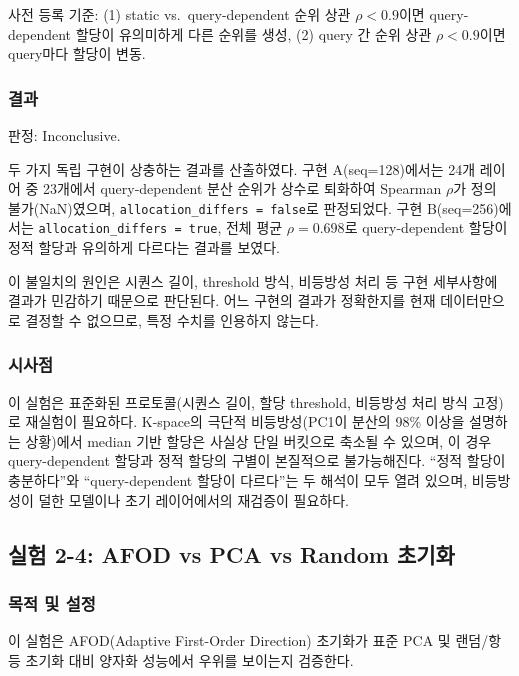 \documentclass[11pt,a4paper]{article}
\begin{document}
사전 등록 기준: (1) static vs.\ query-dependent 순위 상관 $\rho < 0.9$이면 query-dependent 할당이 유의미하게 다른 순위를 생성, (2) query 간 순위 상관 $\rho < 0.9$이면 query마다 할당이 변동.

\subsubsection{결과}

판정: \textcolor{inconclusive}{Inconclusive}.

두 가지 독립 구현이 상충하는 결과를 산출하였다.
구현 A(seq=128)에서는 24개 레이어 중 23개에서 query-dependent 분산 순위가 상수로 퇴화하여 Spearman $\rho$가 정의 불가(NaN)였으며, \texttt{allocation\_differs = false}로 판정되었다.
구현 B(seq=256)에서는 \texttt{allocation\_differs = true}, 전체 평균 $\rho = 0.698$로 query-dependent 할당이 정적 할당과 유의하게 다르다는 결과를 보였다.

이 불일치의 원인은 시퀀스 길이, threshold 방식, 비등방성 처리 등 구현 세부사항에 결과가 민감하기 때문으로 판단된다.
어느 구현의 결과가 정확한지를 현재 데이터만으로 결정할 수 없으므로, 특정 수치를 인용하지 않는다.

\subsubsection{시사점}

이 실험은 표준화된 프로토콜(시퀀스 길이, 할당 threshold, 비등방성 처리 방식 고정)로 재실험이 필요하다.
K-space의 극단적 비등방성(PC1이 분산의 98\% 이상을 설명하는 상황)에서 median 기반 할당은 사실상 단일 버킷으로 축소될 수 있으며, 이 경우 query-dependent 할당과 정적 할당의 구별이 본질적으로 불가능해진다.
``정적 할당이 충분하다''와 ``query-dependent 할당이 다르다''는 두 해석이 모두 열려 있으며, 비등방성이 덜한 모델이나 초기 레이어에서의 재검증이 필요하다.

\subsection{실험 2-4: AFOD vs PCA vs Random 초기화}

\subsubsection{목적 및 설정}

이 실험은 AFOD(Adaptive First-Order Direction) 초기화가 표준 PCA 및 랜덤/항등 초기화 대비 양자화 성능에서 우위를 보이는지 검증한다.
\end{document}
